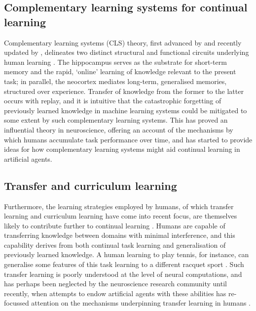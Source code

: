 \documentclass{article} %
\begin{document}

\subsection*{Complementary learning systems for continual learning}

Complementary learning systems (CLS) theory, first advanced by \citet{mcclelland1995there} and recently updated by \citet{kumaran2016learning}, delineates two distinct structural and functional circuits underlying human learning \citep{mcclelland1995there,kumaran2016learning,girardeau2009selective}. The hippocampus serves as the substrate for short-term memory and the rapid, ‘online’ learning of knowledge relevant to the present task; in parallel, the neocortex mediates long-term, generalised memories, structured over experience. Transfer of knowledge from the former to the latter occurs with replay, and it is intuitive that the catastrophic forgetting of previously learned knowledge in machine learning systems could be mitigated to some extent by such complementary learning systems. This has proved an influential theory in neuroscience, offering an account of the mechanisms by which humans accumulate task performance over time, and has started to provide ideas for how complementary learning systems might aid continual learning in artificial agents.

\subsection*{Transfer and curriculum learning}

Furthermore, the learning strategies employed by humans, of which transfer learning and curriculum learning have come into recent focus, are themselves likely to contribute further to continual learning \citep{barnett2002and,holyoak1997analogical}. Humans are capable of transferring knowledge between domains with minimal interference, and this capability derives from both continual task learning and generalisation of previously learned knowledge. A human learning to play tennis, for instance, can generalise some features of this task learning to a different racquet sport \citep{goode1986contextual}. Such transfer learning is poorly understood at the level of neural computations, and has perhaps been neglected by the neuroscience research community until recently, when attempts to endow artificial agents with these abilities has re-focussed attention on the mechanisms underpinning transfer learning in humans \citep{weiss2016survey}.
\end{document}
